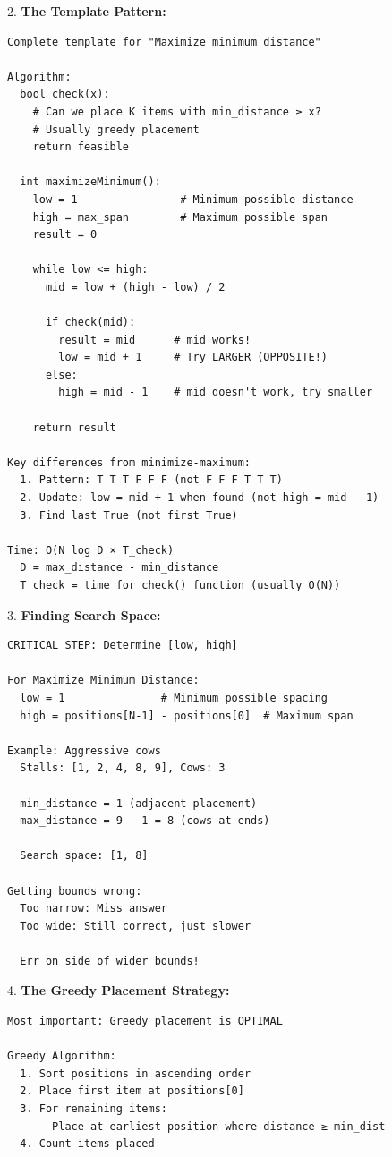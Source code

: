 \documentclass[11pt,a4paper,oneside]{book}
\begin{document}
\begin{tcolorbox}[
    enhanced,breakable,
    colback=white,
    colframe=deepblue,
    boxrule=1.5pt,
    arc=3mm,
    title=\textbf{The Maximize-Minimum Paradigm}
]
2. \textbf{The Template Pattern:}
\begin{verbatim}
Complete template for "Maximize minimum distance"

Algorithm:
  bool check(x):
    # Can we place K items with min_distance ≥ x?
    # Usually greedy placement
    return feasible
  
  int maximizeMinimum():
    low = 1                # Minimum possible distance
    high = max_span        # Maximum possible span
    result = 0
    
    while low <= high:
      mid = low + (high - low) / 2
      
      if check(mid):
        result = mid      # mid works!
        low = mid + 1     # Try LARGER (OPPOSITE!)
      else:
        high = mid - 1    # mid doesn't work, try smaller
    
    return result

Key differences from minimize-maximum:
  1. Pattern: T T T F F F (not F F F T T T)
  2. Update: low = mid + 1 when found (not high = mid - 1)
  3. Find last True (not first True)

Time: O(N log D × T_check)
  D = max_distance - min_distance
  T_check = time for check() function (usually O(N))
\end{verbatim}

3. \textbf{Finding Search Space:}
\begin{verbatim}
CRITICAL STEP: Determine [low, high]

For Maximize Minimum Distance:
  low = 1               # Minimum possible spacing
  high = positions[N-1] - positions[0]  # Maximum span

Example: Aggressive cows
  Stalls: [1, 2, 4, 8, 9], Cows: 3
  
  min_distance = 1 (adjacent placement)
  max_distance = 9 - 1 = 8 (cows at ends)
  
  Search space: [1, 8]

Getting bounds wrong:
  Too narrow: Miss answer
  Too wide: Still correct, just slower
  
  Err on side of wider bounds!
\end{verbatim}

4. \textbf{The Greedy Placement Strategy:}
\begin{verbatim}
Most important: Greedy placement is OPTIMAL

Greedy Algorithm:
  1. Sort positions in ascending order
  2. Place first item at positions[0]
  3. For remaining items:
     - Place at earliest position where distance ≥ min_dist
  4. Count items placed


\end{verbatim}
\end{tcolorbox}
\end{document}
